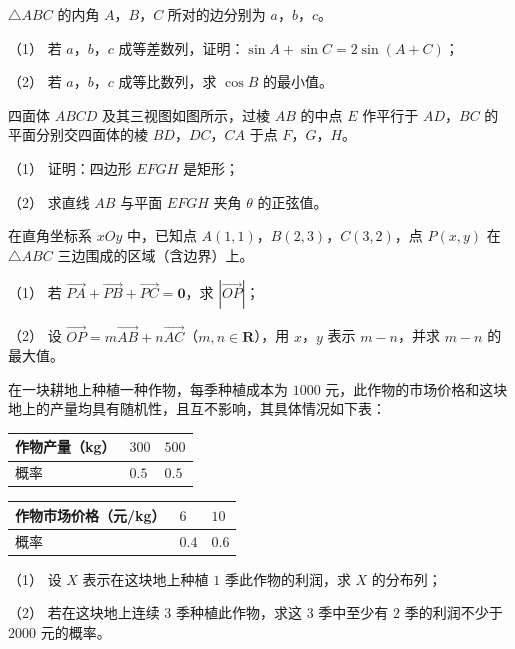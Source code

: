 \begin{question}
$\triangle ABC$ 的内角 $A$，$B$，$C$ 所对的边分别为 $a$，$b$，$c$。

（1） 若 $a$，$b$，$c$ 成等差数列，证明：$\sin A+\sin C=2\sin(A+C)$；

（2） 若 $a$，$b$，$c$ 成等比数列，求 $\cos B$ 的最小值。

\Needspace{0.4\textheight}
\end{question}
\begin{question}
四面体 $ABCD$ 及其三视图如图所示，过棱 $AB$ 的中点 $E$ 作平行于 $AD$，$BC$ 的平面分别交四面体的棱 $BD$，$DC$，$CA$ 于点 $F$，$G$，$H$。
\nopagebreak[4]
\begin{center}\end{center}
\nopagebreak[4]
（1） 证明：四边形 $EFGH$ 是矩形；

（2） 求直线 $AB$ 与平面 $EFGH$ 夹角 $\theta$ 的正弦值。

\end{question}
\begin{question}
在直角坐标系 $xOy$ 中，已知点 $A(1,1)$，$B(2,3)$，$C(3,2)$，点 $P(x,y)$ 在 $\triangle ABC$ 三边围成的区域（含边界）上。

（1） 若 $\overrightarrow{PA}+\overrightarrow{PB}+\overrightarrow{PC}=\boldsymbol 0$，求 $|\overrightarrow{OP}|$；

（2） 设 $\overrightarrow{OP}=m\overrightarrow{AB}+n\overrightarrow{AC}$（$m,n\in\mathbf R$），用 $x$，$y$ 表示 $m-n$，并求 $m-n$ 的最大值。

\end{question}
\begin{question}
在一块耕地上种植一种作物，每季种植成本为 $1000$ 元，此作物的市场价格和这块地上的产量均具有随机性，且互不影响，其具体情况如下表：

\begin{center}
\begin{tabular}{lll}
\toprule
作物产量（kg） & $300$ & $500$ \\
\midrule
概率 & $0.5$ & $0.5$ \\
\bottomrule
\end{tabular}
\end{center}

\begin{center}
\begin{tabular}{lll}
\toprule
作物市场价格（元/kg） & $6$ & $10$ \\
\midrule
概率 & $0.4$ & $0.6$ \\
\bottomrule
\end{tabular}
\end{center}

（1） 设 $X$ 表示在这块地上种植 $1$ 季此作物的利润，求 $X$ 的分布列；

（2） 若在这块地上连续 $3$ 季种植此作物，求这 $3$ 季中至少有 $2$ 季的利润不少于 $2000$ 元的概率。

\Needspace{0.4\textheight}
\end{question}
